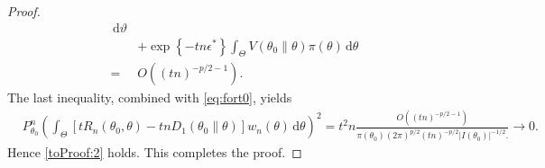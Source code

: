 \documentclass[11pt]{article}
\theoremstyle{plain}
\theoremstyle{definition}
\theoremstyle{remark}
\begin{document}
\begin{appendices}
\begin{proof}
\begin{align*}
     \, \mathrm d \vartheta
     \\
     &+
     \exp\left\{ -tn \epsilon^* \right\} \int_{\Theta} V(\theta_0 \| \theta) \pi(\theta) \, \mathrm d \theta
     \\
     =&
     O\left( (tn)^{ - p/2 - 1 }\right)
     .
\end{align*}
The last inequality, combined with \eqref{eq:fort0}, yields
\begin{align*}
    &
    P_{\theta_0}^n
    \left( 
    \int_{\Theta}
    \left[   t R_n(\theta_0, \theta) - tn D_1 (\theta_0 \| \theta )  \right]
    w_n (\theta) \, \mathrm d \theta
    \right)^2
    =
    t^2 n
    \frac{
        O\left( 
         (tn)^{-p/2-1}
    \right)
}
{
    \pi(\theta_0)
    \left( 
        {2\pi}
    \right)^{p/2}
    \left( 
    { tn}
\right)^{-p/2}
    | I (\theta_0) |^{-1/2}. 
}
\to 0
    .
\end{align*}
Hence \eqref{toProof:2} holds.
This completes the proof.

\end{proof}


\end{appendices}
\end{document}
